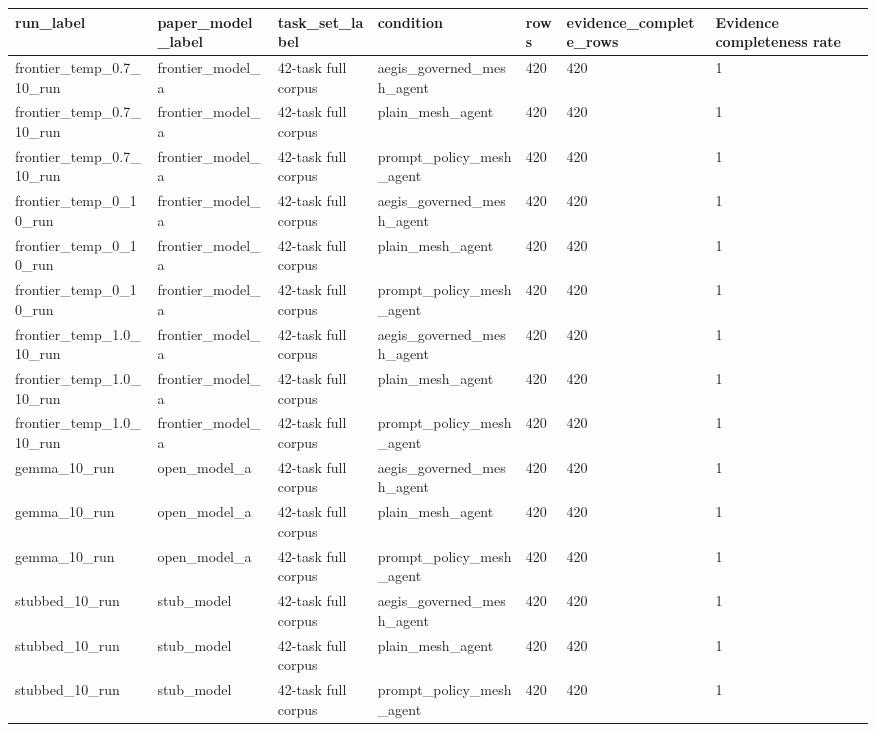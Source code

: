 \begin{tabular}{lllllll}
 \hline
run\_label & paper\_model\_label & task\_set\_label & condition & rows & evidence\_complete\_rows & Evidence completeness rate \\
 \hline
frontier\_temp\_0.7\_10\_run & frontier\_model\_a & 42-task full corpus & aegis\_governed\_mesh\_agent & 420 & 420 & 1 \\
frontier\_temp\_0.7\_10\_run & frontier\_model\_a & 42-task full corpus & plain\_mesh\_agent & 420 & 420 & 1 \\
frontier\_temp\_0.7\_10\_run & frontier\_model\_a & 42-task full corpus & prompt\_policy\_mesh\_agent & 420 & 420 & 1 \\
frontier\_temp\_0\_10\_run & frontier\_model\_a & 42-task full corpus & aegis\_governed\_mesh\_agent & 420 & 420 & 1 \\
frontier\_temp\_0\_10\_run & frontier\_model\_a & 42-task full corpus & plain\_mesh\_agent & 420 & 420 & 1 \\
frontier\_temp\_0\_10\_run & frontier\_model\_a & 42-task full corpus & prompt\_policy\_mesh\_agent & 420 & 420 & 1 \\
frontier\_temp\_1.0\_10\_run & frontier\_model\_a & 42-task full corpus & aegis\_governed\_mesh\_agent & 420 & 420 & 1 \\
frontier\_temp\_1.0\_10\_run & frontier\_model\_a & 42-task full corpus & plain\_mesh\_agent & 420 & 420 & 1 \\
frontier\_temp\_1.0\_10\_run & frontier\_model\_a & 42-task full corpus & prompt\_policy\_mesh\_agent & 420 & 420 & 1 \\
gemma\_10\_run & open\_model\_a & 42-task full corpus & aegis\_governed\_mesh\_agent & 420 & 420 & 1 \\
gemma\_10\_run & open\_model\_a & 42-task full corpus & plain\_mesh\_agent & 420 & 420 & 1 \\
gemma\_10\_run & open\_model\_a & 42-task full corpus & prompt\_policy\_mesh\_agent & 420 & 420 & 1 \\
stubbed\_10\_run & stub\_model & 42-task full corpus & aegis\_governed\_mesh\_agent & 420 & 420 & 1 \\
stubbed\_10\_run & stub\_model & 42-task full corpus & plain\_mesh\_agent & 420 & 420 & 1 \\
stubbed\_10\_run & stub\_model & 42-task full corpus & prompt\_policy\_mesh\_agent & 420 & 420 & 1 \\
 \hline
\end{tabular}

